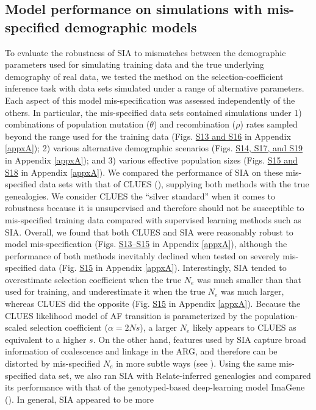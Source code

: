\subsection{Model performance on simulations with mis-specified demographic models}
To evaluate the robustness of \ac{SIA} to mismatches between the demographic parameters used for simulating training data and the true underlying demography of real data, we tested the method on the selection-coefficient inference task with data sets simulated under a range of alternative parameters. Each aspect of this model mis-specification was assessed independently of the others. In particular, the mis-specified data sets contained simulations under 1) combinations of population mutation ($\theta$) and recombination ($\rho$) rates sampled beyond the range used for the training data (Figs. \href{https://academic.oup.com/mbe/article/39/1/msab332/6433161?login=true#supplementary-data}{S13 and S16} in Appendix \ref{appxA}); 2) various alternative demographic scenarios (Figs. \href{https://academic.oup.com/mbe/article/39/1/msab332/6433161?login=true#supplementary-data}{S14, S17, and S19} in Appendix \ref{appxA}); and 3) various effective population sizes (Figs. \href{https://academic.oup.com/mbe/article/39/1/msab332/6433161?login=true#supplementary-data}{S15 and S18} in Appendix \ref{appxA}). We compared the performance of \ac{SIA} on these mis-specified data sets with that of CLUES (\cite{stern_approximate_2019}), supplying both methods with the true genealogies. We consider CLUES the “silver standard” when it comes to robustness because it is unsupervised and therefore should not be susceptible to mis-specified training data compared with supervised learning methods such as \ac{SIA}. Overall, we found that both CLUES and \ac{SIA} were reasonably robust to model mis-specification (Figs. \href{https://academic.oup.com/mbe/article/39/1/msab332/6433161?login=true#supplementary-data}{S13–S15} in Appendix \ref{appxA}), although the performance of both methods inevitably declined when tested on severely mis-specified data (Fig. \href{https://academic.oup.com/mbe/article/39/1/msab332/6433161?login=true#supplementary-data}{S15} in Appendix \ref{appxA}). Interestingly, \ac{SIA} tended to overestimate selection coefficient when the true $N_e$ was much smaller than that used for training, and underestimate it when the true $N_e$ was much larger, whereas CLUES did the opposite (Fig. \href{https://academic.oup.com/mbe/article/39/1/msab332/6433161?login=true#supplementary-data}{S15} in Appendix \ref{appxA}). Because the CLUES likelihood model of \ac{AF} transition is parameterized by the population-scaled selection coefficient ($\alpha = 2Ns$), a larger $N_e$ likely appears to CLUES as equivalent to a higher $s$. On the other hand, features used by \ac{SIA} capture broad information of coalescence and linkage in the \ac{ARG}, and therefore can be distorted by mis-specified $N_e$ in more subtle ways (see ). Using the same mis-specified data set, we also ran \ac{SIA} with Relate-inferred genealogies and compared its performance with that of the genotyped-based deep-learning model ImaGene (\cite{flagel_unreasonable_2019,torada_imagene_2019}). In general, \ac{SIA} appeared to be more 